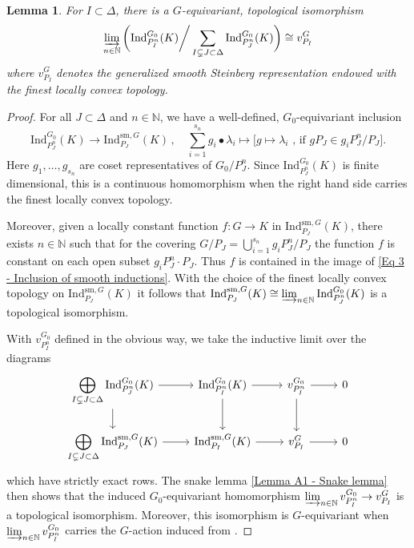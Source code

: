 \documentclass[a4paper, reqno, 10pt]{amsart}
\newtheorem{lemma}[theorem]{Lemma}
\theoremstyle{definition}
\numberwithin{equation}{section}
\newcommand{\Ind}{{\mathrm{Ind}}}
\newcommand{\lra}{\longrightarrow}
\newcommand{\lto}{\longmapsto}
\newcommand{\mto}{\mapsto}
\newcommand{\ra}{\rightarrow}
\newcommand{\sm}{{\mathrm{sm}}}
\newcommand{\BN}{{\mathbb {N}}}
\begin{document}
\begin{lemma}\label{Lemma 3 - Generalized Steinberg representation as inductive limit}
	For $I\subset \Delta$, there is a $G$-equivariant, topological isomorphism
	\begin{equation*}
		\varinjlim_{n \in \BN} \bigg( \Ind^{G_0}_{P^n_{I}} (K) \bigg/ \sum_{I \subsetneq J \subset \Delta} \Ind^{G_0}_{P_{J}^n} (K) \bigg) \cong v^{G}_{P_{I}}
	\end{equation*}
	where $v^G_{P_I}$ denotes the generalized smooth Steinberg representation endowed with the finest locally convex topology.	
\end{lemma}
\begin{proof}
	For all $J\subset \Delta$ and $n\in \BN$, we have a well-defined, $G_0$-equivariant inclusion
	\begin{equation}\label{Eq 3 - Inclusion of smooth inductions}
		\Ind^{G_0}_{P_J^n} (K) \lra \Ind_{P_{J}}^{\sm, G} (K) \,,\quad \sum_{i=1}^{s_n} g_i \bullet \lambda_i \lto \big[ g \mto \lambda_i \text{ , if $gP_J\in g_i P_J^n/P_J$} \big] .
	\end{equation} 
	Here $g_1,\ldots,g_{s_n}$ are coset representatives of $G_0/P^n_J$.
	Since $\Ind^{G_0}_{P_J^n} (K)$ is finite dimensional, this is a continuous homomorphism when the right hand side carries the finest locally convex topology.
	
	
	Moreover, given a locally constant function $f\colon G \ra K$ in $\Ind^{\sm, G}_{P_{J}} (K) $, there exists $n\in \BN$ such that for the covering $G/P_J = \bigcup_{i=1}^{s_n} g_i P^n_J/P_J $ the function $f$ is constant on each open subset $g_i P^n_J \cdot P_J$.
	Thus $f$ is contained in the image of \eqref{Eq 3 - Inclusion of smooth inductions}.
	With the choice of the finest locally convex topology on $\Ind^{\sm, G}_{P_{J}} (K)$ it follows that $\Ind^{\sm,G}_{P_{J}} (K) \cong \varinjlim_{n\in \BN} \Ind^{G_0}_{P^n_J} (K)$ is a topological isomorphism.
	
	
	With $v^{G_0}_{P^n_I}$ defined in the obvious way, we take the inductive limit over the diagrams
	\begin{equation*}
		\begin{tikzcd}
			\displaystyle\bigoplus_{I \subsetneq J \subset \Delta} \Ind^{G_0}_{P_{J}^n} (K) \ar[r] \ar[d] & \Ind^{G_0}_{P^n_I} (K) \ar[r] \ar[d] & v^{G_0}_{P^n_I}  \ar[r] \ar[d] & 0 \\
			\displaystyle\bigoplus_{I \subsetneq J \subset \Delta} \Ind^{\sm, G}_{P_{J}} (K) \ar[r]  & \Ind^{\sm, G}_{P_{I}} (K) \ar[r]  & v^{G}_{P_{I}} \ar[r] & 0 
		\end{tikzcd}
	\end{equation*}
	which have strictly exact rows.
	The snake lemma \ref{Lemma A1 - Snake lemma} then shows that the induced $G_0$-equivariant homomorphism $\varinjlim_{n\in \BN} v^{G_0}_{P^n_I} \ra v^{G}_{P_{I}}$ is a topological isomorphism.
	Moreover, this isomorphism is $G$-equivariant when $\varinjlim_{n\in \BN} v^{G_0}_{P^n_I}$ carries the $G$-action induced from .
\end{proof}
\end{document}
